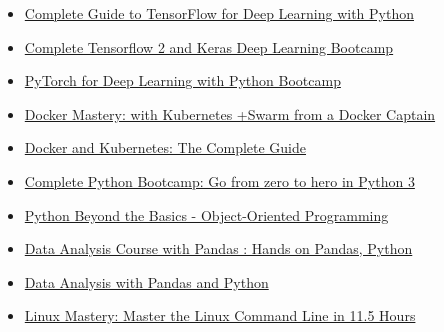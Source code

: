 \documentclass[11pt,a4paper,sans]{moderncv} %
\begin{document}
	\begin{multicols}{2}
		\begin{itemize}
		    \item {} \href{https://www.udemy.com/course/complete-guide-to-tensorflow-for-deep-learning-with-python/learn/lecture/8073744?start=15#overview}{Complete Guide to TensorFlow for Deep Learning with Python}
		    
		    \item {} \href{https://www.udemy.com/course/complete-tensorflow-2-and-keras-deep-learning-bootcamp/}{Complete Tensorflow 2 and Keras Deep Learning Bootcamp}
		    
		    \item {}
		    \href{https://janaltaml.udemy.com/course/pytorch-for-deep-learning-with-python-bootcamp/}{PyTorch for Deep Learning with Python Bootcamp}
		
		    \item {}
		    \href{https://www.udemy.com/course/docker-mastery/learn/lecture/6489880?start=15#overview}{Docker Mastery: with Kubernetes +Swarm from a Docker Captain}
		
		    \item {}
		    \href{https://www.udemy.com/course/docker-and-kubernetes-the-complete-guide/}{Docker and Kubernetes: The Complete Guide}
		
			\item {} \href{https://www.udemy.com/course/complete-python-bootcamp/}{Complete Python Bootcamp: Go from zero to hero in Python 3} 
			
			\item {} \href{https://www.udemy.com/course/python-beyond-the-basics-object-oriented-programming/}{Python Beyond the Basics - Object-Oriented Programming}
			
			\item {} \href{https://www.udemy.com/course/data-analysis-with-pandas-python/}{Data Analysis Course with Pandas : Hands on Pandas, Python}
			
			\item {} \href{https://www.udemy.com/course/data-analysis-with-pandas/}{Data Analysis with Pandas and Python}
			
			\item {} \href{https://www.udemy.com/course/linux-mastery/}{Linux Mastery: Master the Linux Command Line in 11.5 Hours}
			

\end{itemize}
\end{multicols}
\end{document}
